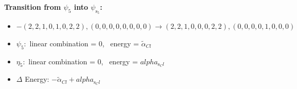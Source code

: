 \documentclass[12pt,a4paper]{article}
\begin{document}
        \noindent\textbf{Transition from $\psi_{5}$ into $\psi_{\text{s}_{5}}$:}
        \begin{itemize}
            \item $- (2, 2, 1, 0, 1, 0, 2, 2), (0, 0, 0, 0, 0, 0, 0, 0) \rightarrow (2, 2, 1, 0, 0, 0, 2, 2), (0, 0, 0, 0, 1, 0, 0, 0)$
        
            \item $\psi_{5}:$ linear combination = $0$, \
            energy = $\tilde{\alpha}_{Cl}$
            
            \item $\eta_{5}:$ linear combination = $0$, \
            energy = $alpha_{\text{s}_Cl}$
            
                \item $\Delta$ Energy: $- \tilde{\alpha}_{Cl} + alpha_{\text{s}_Cl}$

\end{itemize}
\end{document}
